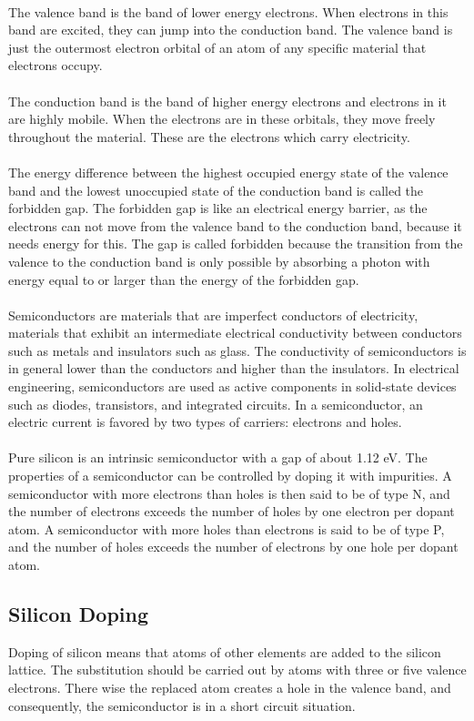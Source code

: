 \documentclass{report}
\begin{document}
\\
The valence band is the band of lower energy electrons.  When electrons in this band are excited, they can jump into the conduction band.  The valence band is just the outermost electron orbital of an atom of any specific material that electrons occupy.\\
\\
The conduction band is the band of higher energy electrons and electrons in it are highly mobile.  When the electrons are in these orbitals, they move freely throughout the material. These are the electrons which carry electricity.\\
\\
The energy difference between the highest occupied energy state of the valence band and the lowest unoccupied state of the conduction band is called the forbidden gap. The forbidden gap is like an electrical energy barrier, as the electrons can not move from the valence band to the conduction band, because it needs energy for this. The gap is called forbidden because the transition from the valence to the conduction band is only possible by absorbing a photon with energy equal to or larger than the energy of the forbidden gap.\\
\\
Semiconductors are materials that are imperfect conductors of electricity, materials that exhibit an intermediate electrical conductivity between conductors such as metals and insulators such as glass. The conductivity of semiconductors is in general lower than the conductors and higher than the insulators. In electrical engineering, semiconductors are used as active components in solid-state devices such as diodes, transistors, and integrated circuits. In a semiconductor, an electric current is favored by two types of carriers: electrons and holes\cite{texbook}.\\
\\
Pure silicon is an intrinsic semiconductor with a gap of about 1.12 eV.  The properties of a semiconductor can be controlled by doping it with impurities. A semiconductor with more electrons than holes is then said to be of type N, and the number of electrons exceeds the number of holes by one electron per dopant atom. A semiconductor with more holes than electrons is said to be of type P, and the number of holes exceeds the number of electrons by one hole per dopant atom\cite{texbook2}.

\subsection{Silicon Doping}
Doping of silicon means that atoms of other elements are added to the silicon lattice. The substitution should be carried out by atoms with three or five valence electrons. There wise the replaced atom creates a hole in the valence band, and consequently, the semiconductor is in a short circuit situation\cite{texbook3}.
\end{document}
